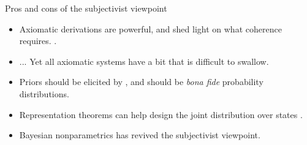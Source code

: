 \documentclass[10pt]{beamer}
\begin{document}




\begin{frame}{Pros and cons of the subjectivist viewpoint}
\begin{itemize}
  \item Axiomatic derivations are powerful, and shed light on what coherence requires. .
  \vfill
  \item[\frownie] ... Yet all axiomatic systems have a bit that is difficult to swallow.
  \vfill
  \item Priors should be elicited by , and should be \emph{bona fide} probability distributions.
  \vfill
  \item Representation theorems can help design the joint distribution over states \citep{OrRo14}.
  \vfill
  \item Bayesian nonparametrics has revived the subjectivist viewpoint.
\end{itemize}

\end{frame}
\end{document}
